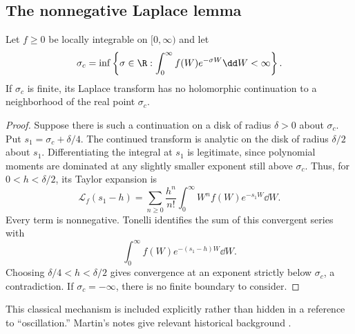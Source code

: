 \subsection{The nonnegative Laplace lemma}
\begin{lemma}
Let $f\ge0$ be locally integrable on $[0,\infty)$ and let
\[
\sigma_c=\inf\left\{\sigma\in\R:\int_0^\infty f(W)e^{-\sigma W}\dd W<\infty\right\}.
\]
If $\sigma_c$ is finite, its Laplace transform has no holomorphic continuation to a neighborhood of the real point $\sigma_c$.
\end{lemma}
\begin{proof}
Suppose there is such a continuation on a disk of radius $\delta>0$ about $\sigma_c$. Put $s_1=\sigma_c+\delta/4$. The continued transform is analytic on the disk of radius $\delta/2$ about $s_1$. Differentiating the integral at $s_1$ is legitimate, since polynomial moments are dominated at any slightly smaller exponent still above $\sigma_c$. Thus, for $0<h<\delta/2$, its Taylor expansion is
\[
\mathcal L_f(s_1-h)=\sum_{n\ge0}\frac{h^n}{n!}\int_0^\infty W^nf(W)e^{-s_1W}\dd W.
\]
Every term is nonnegative. Tonelli identifies the sum of this convergent series with
\[
\int_0^\infty f(W)e^{-(s_1-h)W}\dd W.
\]
Choosing $\delta/4<h<\delta/2$ gives convergence at an exponent strictly below $\sigma_c$, a contradiction. If $\sigma_c=-\infty$, there is no finite boundary to consider.
\end{proof}
This classical mechanism is included explicitly rather than hidden in a reference to ``oscillation.'' Martin's notes give relevant historical background \cite{martin}.

